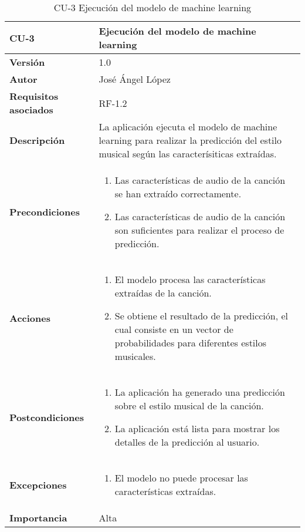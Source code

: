\begin{table}[p]
	\centering
	\begin{tabularx}{\linewidth}{ p{} p{} }
		\toprule
		\textbf{CU-3}    & \textbf{Ejecución del modelo de machine learning}\\
		\toprule
		\textbf{Versión}              & 1.0    \\
		\textbf{Autor}                & José Ángel López \\
		\textbf{Requisitos asociados} & RF-1.2 \\
		\textbf{Descripción}          & La aplicación ejecuta el modelo de machine learning para realizar la predicción del estilo musical según las caracterísiticas extraídas. \\
		\textbf{Precondiciones}        & 
		\begin{enumerate}		    
			\def\labelenumi{\arabic{enumi}.}
			\tightlist
			\item Las características de audio de la canción se han extraído correctamente.
			\item Las características de audio de la canción son suficientes para realizar el proceso de predicción.
		\end{enumerate}\\
		\textbf{Acciones}             &
		\begin{enumerate}
			\def\labelenumi{\arabic{enumi}.}
			\tightlist
			\item El modelo procesa las características extraídas de la canción.
			\item Se obtiene el resultado de la predicción, el cual consiste en un vector de probabilidades para diferentes estilos musicales.
		\end{enumerate}\\
		\textbf{Postcondiciones} &
		\begin{enumerate}
			\def\labelenumi{\arabic{enumi}.}
			\tightlist
			\item La aplicación ha generado una predicción sobre el estilo musical de la canción.
			\item La aplicación está lista para mostrar los detalles de la predicción al usuario.
		\end{enumerate}\\
		\textbf{Excepciones} &
		\begin{enumerate}
			\def\labelenumi{\arabic{enumi}.}
			\tightlist
			\item El modelo no puede procesar las características extraídas.
		\end{enumerate}\\
		\textbf{Importancia}          & Alta \\
		\bottomrule
	\end{tabularx}
	\caption{CU-3 Ejecución del modelo de machine learning}
\end{table}

